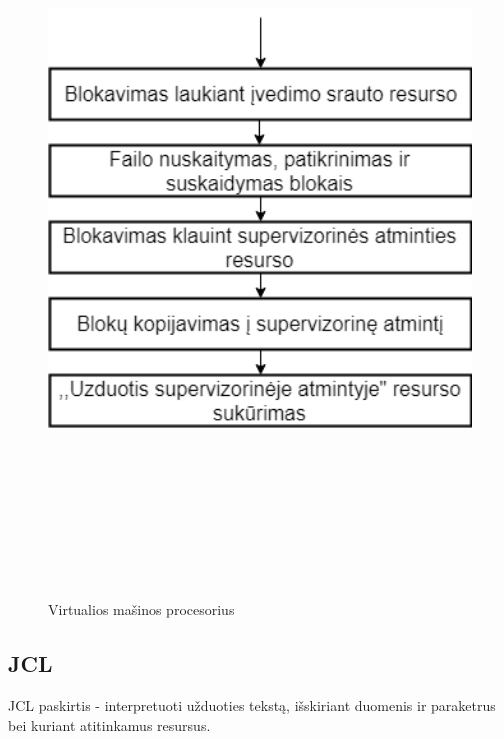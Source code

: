 \documentclass[oneside]{VUMIFPSkursinis}
\begin{document}
\begin{figure}[H]
		\centering	
	\includegraphics[width=18cm,height=20cm,keepaspectratio]{Read.png}
	\caption{Virtualios mašinos procesorius}
	\label{fig:Virtualios mašinos procesorius}
\end{figure} 

\subsection{JCL} JCL paskirtis - interpretuoti užduoties tekstą, išskiriant duomenis ir paraketrus bei kuriant atitinkamus resursus.
\end{document}
